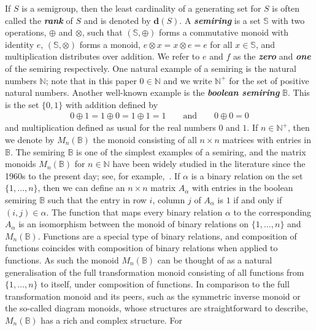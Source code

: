 \documentclass[11pt]{article}
\newcommand{\defn}[1]{\textbf{\textit{#1}}}
\numberwithin{equation}{section}
\newcommand{\B}{\mathbb{B}}
\newcommand{\Bn}{M_n(\B)}
\newcommand{\N}{\mathbb{N}}
\newcommand{\Np}{\N^{+}}
\newcommand{\AND}{\qquad\text{and}\qquad}
\begin{document}
If $S$ is a semigroup, then the least cardinality of a generating set for $S$ is
often called the \defn{rank} of $S$ and is denoted by $\mathbf{d}(S)$. 
A \defn{semiring} is a set $\mathbb{S}$ with two operations, $\oplus$ and $\otimes$,
such that $(\mathbb{S}, \oplus)$ forms a commutative monoid with identity $e$,
$(\mathbb{S}, \otimes)$ forms a monoid, $e\otimes x = x\otimes e = e$ for all $x
\in \mathbb{S}$, and multiplication distributes over addition. We refer to $e$
and $f$ as the \defn{zero} and \defn{one} of the semiring respectively.  One
natural example of a semiring is the natural numbers $\N$; note that in this
paper $0 \in \N$ and we write $\Np$ for the set of positive natural numbers.
Another well-known example is the \defn{boolean semiring} $\B$. This is the set
$\{0, 1\}$ with addition defined by 
\begin{align*}
  0 \oplus 1 = 1 \oplus 0 = 1 \oplus 1 = 1 \AND
  0 \oplus 0 = 0
\end{align*}
and multiplication defined as usual for the real numbers $0$ and $1$. If $n\in
\Np$, then we denote by $\Bn$ the monoid consisting of all $n\times n$ matrices
with entries in $\B$.
The semiring $\B$ is one of the simplest examples of a semiring, and the matrix
monoids $\Bn$ for $n \in \N$ have been widely studied in the literature since
the 1960s to the present day;
see, for example,~\cite{Breen2001aa, Breen1997aa, Butler1974aa, Caen1981aa, Cho1993aa,
  Cho1993ab, Fenner2018aa, Kim1982aa, Konieczny1992aa, Li1995aa, Plemmons1970aa,
  Plemmons1970ab, Roush1977aa, Schwarz1973aa, Shaofang1998aa, Tan2000aa,
  Zivkovic2006aa}. If $\alpha$ is a binary relation on the set $\{1, \ldots,
  n\}$, then we can define an $n\times n$ matrix $A_{\alpha}$ with entries in
the boolean semiring $\B$ such that the entry in row $i$, column $j$ of
$A_{\alpha}$ is $1$ if and only if $(i, j) \in \alpha$. The function that maps
every binary relation $\alpha$ to the corresponding $A_{\alpha}$ is an
isomorphism  between the monoid of binary relations on $\{1,  \ldots, n\}$ and
$\Bn$. Functions are a special type of binary relations, and composition of
functions coincides with composition of binary relations when applied to
functions.  As such the monoid $\Bn$ can be thought of as a natural
generalisation of the full transformation monoid consisting of all functions
from $\{1, \ldots, n\}$ to itself, under composition of functions.  In
comparison to the full transformation monoid and its peers, such as the
symmetric inverse monoid or the so-called diagram monoids, whose structures are
straightforward to describe, $\Bn$ has a rich and complex structure.  For
\end{document}
